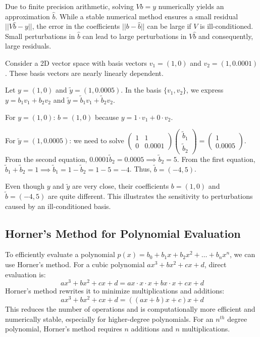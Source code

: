 \documentclass{article}
\begin{document}
Due to finite precision arithmetic, solving $Vb=y$ numerically yields an approximation $\hat{b}$. While a stable numerical method ensures a small residual $||V\hat{b} - y||$, the error in the coefficients $||b - \hat{b}||$ can be large if $V$ is ill-conditioned. Small perturbations in $\hat{b}$ can lead to large perturbations in $V\hat{b}$ and consequently, large residuals.

Consider a 2D vector space with basis vectors $v_1 = (1, 0)$ and $v_2 = (1, 0.0001)$. These basis vectors are nearly linearly dependent.

Let $y = (1, 0)$ and $\tilde{y} = (1, 0.0005)$. In the basis $\{v_1, v_2\}$, we express $y = b_1 v_1 + b_2 v_2$ and $\tilde{y} = \tilde{b}_1 v_1 + \tilde{b}_2 v_2$.

For $y = (1, 0)$:
$b = (1, 0)$ because $y = 1 \cdot v_1 + 0 \cdot v_2$.

For $\tilde{y} = (1, 0.0005)$: we need to solve
$\begin{pmatrix} 1 & 1 \\ 0 & 0.0001 \end{pmatrix} \begin{pmatrix} \tilde{b}_1 \\ \tilde{b}_2 \end{pmatrix} = \begin{pmatrix} 1 \\ 0.0005 \end{pmatrix}$.
From the second equation, $0.0001 \tilde{b}_2 = 0.0005 \implies \tilde{b}_2 = 5$.
From the first equation, $\tilde{b}_1 + \tilde{b}_2 = 1 \implies \tilde{b}_1 = 1 - \tilde{b}_2 = 1 - 5 = -4$.
Thus, $\tilde{b} = (-4, 5)$.

Even though $y$ and $\tilde{y}$ are very close, their coefficients $b = (1, 0)$ and $\tilde{b} = (-4, 5)$ are quite different. This illustrates the sensitivity to perturbations caused by an ill-conditioned basis.

\subsection{Horner's Method for Polynomial Evaluation}

To efficiently evaluate a polynomial $p(x) = b_0 + b_1 x + b_2 x^2 + \dots + b_n x^n$, we can use Horner's method. For a cubic polynomial $ax^3 + bx^2 + cx + d$, direct evaluation is:
\[ ax^3 + bx^2 + cx + d = ax \cdot x \cdot x + bx \cdot x + cx + d \]
Horner's method rewrites it to minimize multiplications and additions:
\[ ax^3 + bx^2 + cx + d = ((ax + b)x + c)x + d \]
This reduces the number of operations and is computationally more efficient and numerically stable, especially for higher-degree polynomials. For an $n^{th}$ degree polynomial, Horner's method requires $n$ additions and $n$ multiplications.
\end{document}

